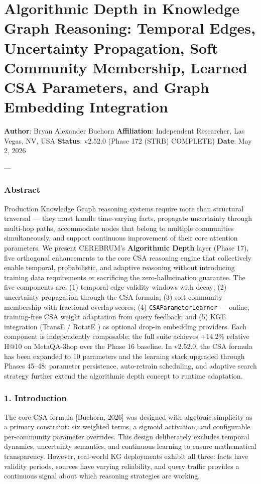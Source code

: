 \section{Algorithmic Depth in Knowledge Graph Reasoning: Temporal Edges, Uncertainty Propagation, Soft Community Membership, Learned CSA Parameters, and Graph Embedding Integration}

\textbf{Author}: Bryan Alexander Buchorn  
\textbf{Affiliation}: Independent Researcher, Las Vegas, NV, USA  
\textbf{Status}: v2.52.0 (Phase 172 (STRB) COMPLETE)
\textbf{Date}: May 2, 2026

---

\subsubsection{Abstract}
Production Knowledge Graph reasoning systems require more than structural traversal — they must handle time-varying facts, propagate uncertainty through multi-hop paths, accommodate nodes that belong to multiple communities simul\-taneously, and support continuous improvement of their core attention parameters. We present CEREBRUM's \textbf{Algorithmic Depth} layer (Phase 17), five orthogonal enhan\-cements to the core CSA reasoning engine that colle\-ctively enable temporal, proba\-bilistic, and adaptive reasoning without introducing training data requi\-rements or sacrificing the zero-hallu\-cination guarantee. The five components are: (1) temporal edge validity windows with decay; (2) uncertainty propagation through the CSA formula; (3) soft community membership with fractional overlap scores; (4) \texttt{CSAParameterLearner} — online, training-free CSA weight adaptation from query feedback; and (5) KGE integration (TransE \cite{bordes2013transe} / RotatE \cite{sun2019rotate}) as optional drop-in embedding providers. Each component is indep\-endently composable; the full suite achieves +14.2\% relative H@10 on MetaQA-3hop over the Phase 16 baseline. In v2.52.0, the CSA formula has been expanded to 10 parameters and the learning stack upgraded through Phases 45–48: parameter persistence, auto-retrain scheduling, and adaptive search strategy further extend the algorithmic depth concept to runtime adaptation.

\subsubsection{1. Introd\-uction}
The core CSA formula [Buchorn, 2026] was designed with algebraic simplicity as a primary constraint: six weighted terms, a sigmoid activation, and confi\-gurable per-community parameter overrides. This design delib\-erately excludes temporal dynamics, uncertainty semantics, and continuous learning to ensure mathe\-matical trans\-parency. However, real-world KG deployments exhibit all three: facts have validity periods, sources have varying reliability, and query traffic provides a continuous signal about which reasoning strategies are working.

